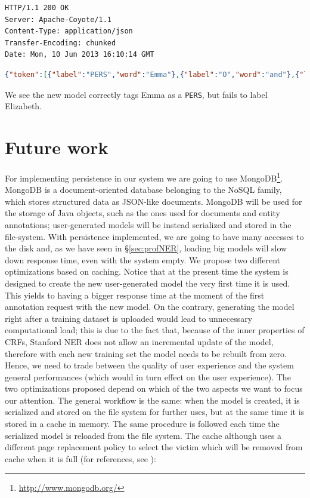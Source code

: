 \documentclass[a4paper,11pt]{report}
\begin{document}
\begin{enumerate}
\begin{lstlisting}
HTTP/1.1 200 OK
Server: Apache-Coyote/1.1
Content-Type: application/json
Transfer-Encoding: chunked
Date: Mon, 10 Jun 2013 16:10:14 GMT
\end{lstlisting}
\begin{lstlisting}[language=json]
{"token":[{"label":"PERS","word":"Emma"},{"label":"O","word":"and"},{"label":"O","word":"Elizabeth"},{"label":"O","word":"shared"},{"label":"O","word":"a"},{"label":"O","word":"dream"},{"label":"O","word":"."}]}
\end{lstlisting}
We see the new model correctly tags Emma as a \texttt{PERS}, but fails to label Elizabeth.
\end{enumerate}
\section{Future work}
For implementing persistence in our system we are going to use MongoDB\footnote{\url{http://www.mongodb.org/}}.
MongoDB is a document-oriented database belonging to the NoSQL family, which stores structured data as JSON-like documents. MongoDB will be used for the storage of Java objects, such as the ones used for documents and entity annotations; user-generated models will be instead serialized and stored in the file-system.
With persistence implemented, we are going to have many accesses to the disk and, as we have seen in \S \ref{sec:profNER}, loading big models will slow down response time, even with the system empty. We propose two different optimizations based on caching. Notice that at the present time the system is designed to create the new user-generated model the very first time it is used. This yields to having a bigger response time at the moment of the first annotation request with the new model. On the contrary, generating the model right after a training dataset is uploaded would lead to unnecessary computational load; this is due to the fact that, because of the inner properties of CRFs, Stanford NER does not allow an incremental update of the model, therefore with each new training set the model needs to be rebuilt from zero. Hence, we need to trade between the quality of user experience and the system general performances (which would in turn effect on the user experience).
The two optimizations proposed depend on which of the two aspects we want to focus our attention. The general workflow is the same: when the model is created, it is serialized and stored on the file system for further uses, but at the same time it is stored in a cache in memory. The same procedure is followed each time the serialized model is reloaded from the file system. The cache although uses a different page replacement policy to select the victim which will be removed from cache when it is full (for references, see \citet{silberOS}):
\end{document}
